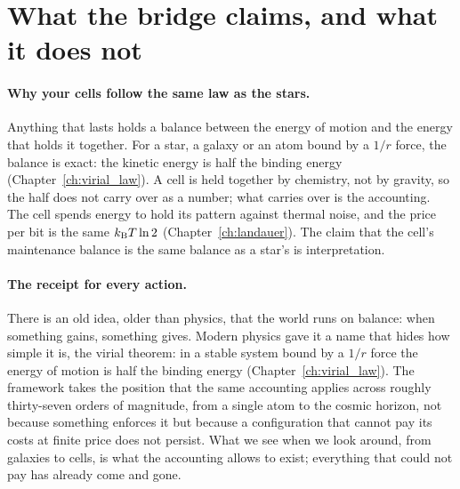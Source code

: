 \section{What the bridge claims, and what it does not}

\paragraph{Why your cells follow the same law as the stars.} Anything that lasts holds a balance between the energy of motion and the energy
that holds it together. For a star, a galaxy or an atom bound by a $1/r$ force, the balance is exact: the kinetic energy is half the binding
energy (Chapter~\ref{ch:virial_law}). \derived{} A cell is held together by chemistry, not by gravity, so the half does not carry over as a
number; what carries over is the accounting. The cell spends energy to hold its pattern against thermal noise, and the price per bit is the
same $k_{\mathrm B} T\ln2$ (Chapter~\ref{ch:landauer}). \derived{} The claim that the cell's maintenance balance is the same balance as a star's is
interpretation. \interp

\paragraph{The receipt for every action.} There is an old idea, older than physics, that the world runs on balance: when something gains,
something gives. Modern physics gave it a name that hides how simple it is, the virial theorem: in a stable system bound by a $1/r$ force
the energy of motion is half the binding energy (Chapter~\ref{ch:virial_law}). \derived{} The framework takes the position that the same
accounting applies across roughly thirty-seven orders of magnitude, from a single atom to the cosmic horizon, not because something
enforces it but because a configuration that cannot pay its costs at finite price does not persist. What we see when we look around, from
galaxies to cells, is what the accounting allows to exist; everything that could not pay has already come and gone. \conjecture

